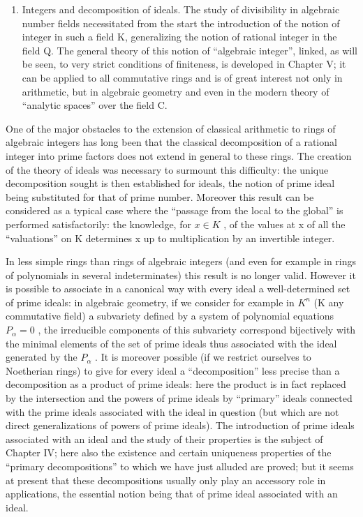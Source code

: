 \begin{enumerate}
\def\labelenumi{\Roman{enumi}.}
\setcounter{enumi}{2}
\tightlist
\item
  Integers and decomposition of ideals. The study of divisibility in algebraic number fields necessitated from the start the introduction of the notion of integer in such a field K, generalizing the notion of rational integer in the field Q. The general theory of this notion of ``algebraic integer'', linked, as will be seen, to very strict conditions of finiteness, is developed in Chapter V; it can be applied to all commutative rings and is of great interest not only in arithmetic, but in algebraic geometry and even in the modern theory of ``analytic spaces'' over the field C.
\end{enumerate}

One of the major obstacles to the extension of classical arithmetic to rings of algebraic integers has long been that the classical decomposition of a rational integer into prime factors does not extend in general to these rings. The creation of the theory of ideals was necessary to surmount this difficulty: the unique decomposition sought is then established for ideals, the notion of prime ideal being substituted for that of prime number. Moreover this result can be considered as a typical case where the ``passage from the local to the global'' is performed satisfactorily: the knowledge, for \(x \in K\) , of the values at x of all the ``valuations'' on K determines x up to multiplication by an invertible integer.

In less simple rings than rings of algebraic integers (and even for example in rings of polynomials in several indeterminates) this result is no longer valid. However it is possible to associate in a canonical way with every ideal a well-determined set of prime ideals: in algebraic geometry, if we consider for example in \(K^{n}\) (K any commutative field) a subvariety defined by a system of polynomial equations \(P_{\alpha}=0\) , the irreducible components of this subvariety correspond bijectively with the minimal elements of the set of prime ideals thus associated with the ideal generated by the \(P_{\alpha}\) . It is moreover possible (if we restrict ourselves to Noetherian rings) to give for every ideal a ``decomposition'' less precise than a decomposition as a product of prime ideals: here the product is in fact replaced by the intersection and the powers of prime ideals by ``primary'' ideals connected with the prime ideals associated with the ideal in question (but which are not direct generalizations of powers of prime ideals). The introduction of prime ideals associated with an ideal and the study of their properties is the subject of Chapter IV; here also the existence and certain uniqueness properties of the ``primary decompositions'' to which we have just alluded are proved; but it seems at present that these decompositions usually only play an accessory role in applications, the essential notion being that of prime ideal associated with an ideal.

